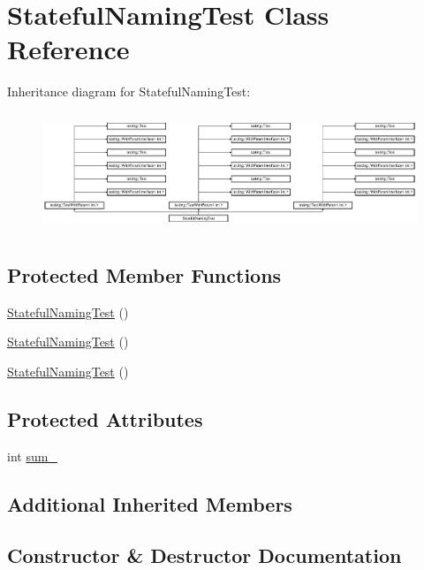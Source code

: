 \hypertarget{class_stateful_naming_test}{}\section{Stateful\+Naming\+Test Class Reference}
\label{class_stateful_naming_test}
Inheritance diagram for Stateful\+Naming\+Test\+:\begin{figure}[H]
\begin{center}
\leavevmode
\includegraphics[height=3.572568cm]{d1/d1c/class_stateful_naming_test}
\end{center}
\end{figure}
\subsection*{Protected Member Functions}
\begin{DoxyCompactItemize}
\item 
\mbox{\hyperlink{class_stateful_naming_test_a49ae5e642d5dab937d8a167ac197d6fd}{Stateful\+Naming\+Test}} ()
\item 
\mbox{\hyperlink{class_stateful_naming_test_a49ae5e642d5dab937d8a167ac197d6fd}{Stateful\+Naming\+Test}} ()
\item 
\mbox{\hyperlink{class_stateful_naming_test_a49ae5e642d5dab937d8a167ac197d6fd}{Stateful\+Naming\+Test}} ()
\end{DoxyCompactItemize}
\subsection*{Protected Attributes}
\begin{DoxyCompactItemize}
\item 
int \mbox{\hyperlink{class_stateful_naming_test_ad719a1c2919c304bfe840313142a376a}{sum\+\_\+}}
\end{DoxyCompactItemize}
\subsection*{Additional Inherited Members}


\subsection{Constructor \& Destructor Documentation}
\mbox{\label{class_stateful_naming_test_a49ae5e642d5dab937d8a167ac197d6fd}} 
